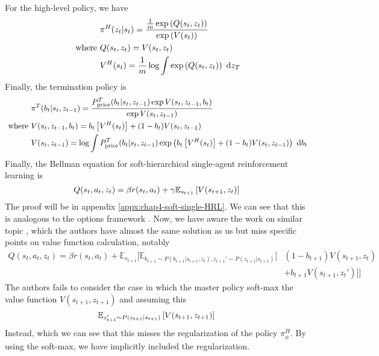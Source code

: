 For the high-level policy, we have 
\begin{equation}
\begin{aligned}
\label{eqn:chap4-single-HRL-higher}
    &\pi^H(z_t | s_t) = \frac{\frac{1}{m}\exp\left( Q(s_t, z_t) \right)}{\exp\left( V(s_t) \right)}
    \\
    \text{ where } &Q(s_t, z_t) =  V(s_t, z_t)  \\
    &V^H(s_t) =  \frac{1}{m}\log \int \exp\left( Q(s_t, z_t) \right) \ \mathrm{d} z_T
\end{aligned} 
\end{equation}
Finally, the termination policy is  
\begin{equation}
\begin{aligned}
\label{eqn:chap4-single-HRL-termination}
    &\pi^T(b_{t} | s_{t}, z_{t-1}) = \frac{P_{\text{prior}}^T(b_{t} | s_{t}, z_{t-1})\exp{V(s_{t}, z_{t-1}, b_{t})}}{\exp V(s_{t}, z_{t-1})} \\
    \text{ where }& V(s_{t}, z_{t-1}, b_{t}) = b_{t} \left[ V^H(s_{t}) \right] + (1-b_{t})V(s_{t}, z_{t-1}) \\
    & V(s_{t}, z_{t-1}) = \log \int P_{\text{prior}}^T(b_{t} | s_{t}, z_{t-1})\exp\left( b_{t} \left[ V^H(s_{t}) \right] + (1-b_{t})V(s_{t}, z_{t-1}) \right) \ \mathrm{d} b_{t}
\end{aligned}
\end{equation}
Finally, the Bellman equation for soft-hierarchical single-agent reinforcement learning is 
\begin{equation}
\label{eqn:chap4-single-HRL-bellman}
    Q(s_t, a_t, z_t) = \beta r(s_t, a_t) + \gamma\mathbb{E}_{s_{t+1}}\left[ V(s_{t+1}, z_t) \right]
\end{equation}
The proof will be in appendix \ref{appx:chap4-soft-single-HRL}. We can see that this is analogous to the options framework \cite{sutton1999between, bacon2017option}. Now, we have aware the work on similar topic \cite{lobo2019soft}, which the authors have almost the same solution as us but miss specific points on value function calculation, notably 
\begin{equation}
\begin{aligned}
Q(s_t, a_t, z_t) = \beta r(s_t, a_t) + \mathbb{E}_{s_{t+1}}\Big[\mathbb{E}_{b_{t+1} \sim P(b_{t+1} | s_{t+1}, z_t), z_{t+1}' \sim P(z_{t+1} | s_{t+1})}\Big[&(1-b_{t+1})V(s_{t+1 }, z_t)  \\
&+ b_{t+1}V(s_{t+1 }, z_t')\Big]\Big]
\end{aligned}
\end{equation}
The authors fails to consider the case in which the master policy soft-max the value function $V(s_{t+1}, z_{t+1})$ and assuming this 
\begin{equation}
    \mathbb{E}_{z_{t+1}' \sim P(z_{t+1} | s_{t+1})}\left[ V(s_{t+1}, z_{t+1}) \right]
\end{equation}
Instead, which we can see that this misses the regularization of the policy $\pi^H_\phi$. By using the soft-max, we have implicitly included the regularization. 